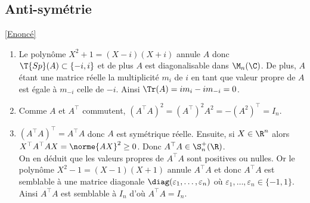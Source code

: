 \documentclass[8pt]{book}
\begin{document}
	\subsection{Anti-symétrie }
	\label{Anti-symétrie corrigé}
	\textcolor{blue}{\hyperref[Anti-symétrie]{[Enoncé]}}\\
	\begin{enumerate}[leftmargin=*]
		\item Le polynôme $X^2+1=(X-i)(X+i)$ annule $A$ donc $\T{Sp}(A)\subset\{-i,i\}$ et de plus $A$ est diagonalisable dans $\M_n(\C)$. De plus, $A$ étant une matrice réelle la multiplicité $m_i$ de $i$ en tant que valeur propre de $A$ est égale à $m_{-i}$ celle de $-i$. Ainsi $\Tr(A)=im_i-im_{-i}=0$.
		\item Comme $A$ et $A^\top$ commutent, $(A^\top A)^2=(A^\top)^2A^2=-(A^2)^\top=I_n$.
		\item $(A^\top A)^\top=A^\top A$ donc $A$ est symétrique réelle. Ensuite, si $X\in \R^n$ alors $X^\top A^\top AX=\norme{AX}^2\geq 0$. Donc $A^\top A\in \S_n^+(\R)$.\\
		On en déduit que les valeurs propres de $A^\top A$ sont positives ou nulles. Or le polynôme $X^2-1=(X-1)(X+1)$ annule $A^\top A$ et donc $A^\top A$ est semblable à une matrice diagonale $\diag(\varepsilon_1,\dots,\varepsilon_n)$ où $\varepsilon_1,\dots,\varepsilon_n\in \{-1,1\}$. Ainsi $A^\top A$ est semblable à $I_n$ d'où $A^\top A=I_n$.
	\end{enumerate}
	
\end{document}
